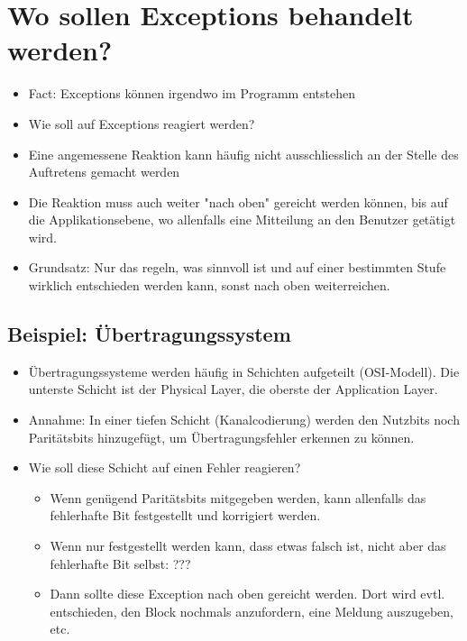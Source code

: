 \section{Wo sollen Exceptions behandelt werden?}
\label{sec:Wo sollen Exceptions behandelt werden?}
\begin{itemize}
	\item Fact: Exceptions können irgendwo im Programm entstehen
	\item Wie soll auf Exceptions reagiert werden?
	\item Eine angemessene Reaktion kann häufig nicht ausschliesslich an der Stelle des Auftretens gemacht werden
	\item Die Reaktion muss auch weiter "nach oben" gereicht werden können, bis auf die Applikationsebene, wo allenfalls eine Mitteilung an den Benutzer getätigt wird.
	\item \begin{hinweis}
		Grundsatz: Nur das regeln, was sinnvoll ist und auf einer bestimmten Stufe wirklich entschieden werden kann, sonst nach oben weiterreichen.
	\end{hinweis}
\end{itemize}

\subsection{Beispiel: Übertragungssystem}
\label{sec:Beispiel: Uebertragungssystem}
\begin{itemize}
	\item Übertragungssysteme werden häufig in Schichten aufgeteilt (OSI-Modell). Die unterste Schicht ist der Physical Layer, die oberste der Application Layer.
	\item Annahme: In einer tiefen Schicht (Kanalcodierung) werden den Nutzbits noch Paritätsbits hinzugefügt, um Übertragungsfehler erkennen zu können.
	\item Wie soll diese Schicht auf einen Fehler reagieren?
	\begin{itemize}
		\item Wenn genügend Paritätsbits mitgegeben werden, kann allenfalls das fehlerhafte Bit festgestellt und korrigiert werden.
		\item Wenn nur festgestellt werden kann, dass etwas falsch ist, nicht aber das fehlerhafte Bit selbst: ???
		\item Dann sollte diese Exception nach oben gereicht werden. Dort wird evtl. entschieden, den Block nochmals anzufordern, eine Meldung auszugeben, etc.
	\end{itemize}
\end{itemize}

